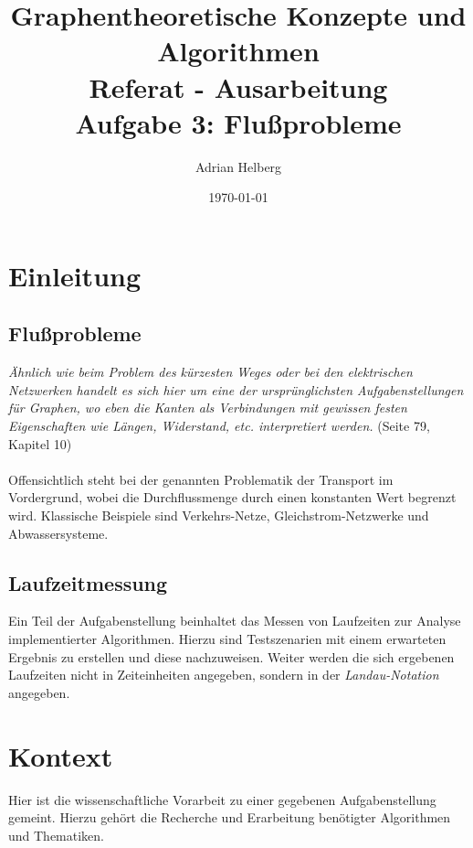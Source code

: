 \documentclass[11pt]{article}
\title{
\Large Graphentheoretische Konzepte und Algorithmen\\
\huge Referat - Ausarbeitung\\
\Large Aufgabe 3: Flu\ss{}probleme\\[0.3in]
}
\author{Adrian Helberg\\}
\date{\today}
\begin{document}
    \maketitle
    \newpage
    \tableofcontents

    \newpage

    \section{Einleitung}

    \subsection{Flu\ss{}probleme}
    \textit{\"Ahnlich wie beim Problem des k\"urzesten Weges oder bei den elektrischen Netzwerken handelt es sich hier um eine der urspr\"unglichsten Aufgabenstellungen f\"ur Graphen, wo eben die Kanten als Verbindungen mit gewissen festen Eigenschaften wie L\"angen, Widerstand, etc. interpretiert werden.} \cite{alggra} (Seite 79, Kapitel 10)\\~\\
    Offensichtlich steht bei der genannten Problematik der Transport im Vordergrund, wobei die Durchflussmenge durch einen konstanten Wert begrenzt wird. Klassische Beispiele sind Verkehrs-Netze, Gleichstrom-Netzwerke und Abwassersysteme.

    \subsection{Laufzeitmessung}
    Ein Teil der Aufgabenstellung beinhaltet das Messen von Laufzeiten zur Analyse implementierter Algorithmen. Hierzu sind Testszenarien mit einem erwarteten Ergebnis zu erstellen und diese nachzuweisen. Weiter werden die sich ergebenen Laufzeiten nicht in Zeiteinheiten angegeben, sondern in der \textit{Landau-Notation} angegeben.

    \section{Kontext}
    Hier ist die wissenschaftliche Vorarbeit zu einer gegebenen Aufgabenstellung gemeint. Hierzu geh\"ort die Recherche und Erarbeitung ben\"otigter Algorithmen und Thematiken.
\end{document}
